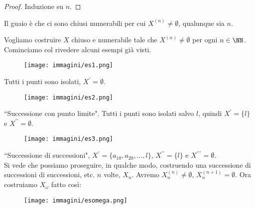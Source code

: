 \documentclass[11pt]{scrartcl}
\begin{document}
\begin{proof}
Induzione su $n$.
\end{proof}

Il guaio è che ci sono chiusi numerabili per cui $X^{(n)} \ne \emptyset$, qualunque sia $n$.

\begin{example}
Vogliamo costruire $X$ chiuso e numerabile tale che $X^{(n)} \ne \emptyset$ per ogni $n \in \NN$. Cominciamo col rivedere alcuni esempi già visti.
\end{example}

\begin{center}
	\begin{figure}[h]
		\centering
		\texttt{[image: immagini/es1.png]}
	\end{figure}
\end{center}

Tutti i punti sono isolati, $X^{\prime} = \emptyset$.

\pagebreak

\begin{center}
	\begin{figure}[h]
		\centering
		\texttt{[image: immagini/es2.png]}
	\end{figure}
\end{center}

``Successione con punto limite". Tutti i punti sono isolati salvo $l$, quindi $X^{\prime} = \{l\}$ e $X^{\prime\prime} = \emptyset$.

\begin{center}
	\begin{figure}[h]
		\centering
		\texttt{[image: immagini/es3.png]}
	\end{figure}
\end{center}

``Successione di successioni", $X^{\prime} = \{a_{10}, a_{20}, \ldots, l\}$, $X^{\prime\prime} = \{l\}$ e $X^{\prime\prime\prime} = \emptyset$.\\
Si vede che possiamo proseguire, in qualche modo, costruendo una successione di successioni di successioni, etc. $n$ volte, $X_n$. Avremo $X_n^{(n)} \ne \emptyset$, $X_n^{(n+1)} = \emptyset$. Ora costruiamo 
$X_{\omega}$ fatto così:

\begin{center}
	\begin{figure}[h]
		\centering
		\texttt{[image: immagini/esomega.png]}
	\end{figure}
\end{center}
\end{document}
